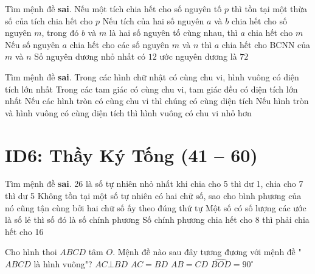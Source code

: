 \begin{ex}%
	Tìm mệnh đề \textbf{sai}.
	\choice
	{Nếu một tích chia hết cho số nguyên tố $p$ thì tồn tại một thừa số của tích chia hết cho $p$}
	{Nếu tích của hai số nguyên $a$ và $b$ chia hết cho số nguyên $m$, trong đó $b$ và $m$ là hai số nguyên tố cùng nhau, thì $a$ chia hết cho $m$}
	{Nếu số nguyên $a$ chia hết cho các số nguyên $m$ và $n$ thì $a$ chia hết cho BCNN của $m$ và $n$}
	{\True Số nguyên dương nhỏ nhất có $12$ ước nguyên dương là $72$} 
\end{ex}


\begin{ex}%
	Tìm mệnh đề \textbf{sai}.
	\choice
	{Trong các hình chữ nhật có cùng chu vi, hình vuông có diện tích lớn nhất}
	{Trong các tam giác có cùng chu vi, tam giác đều có diện tích lớn nhất}
	{Nếu các hình tròn có cùng chu vi thì chúng có cùng diện tích}
	{\True Nếu hình tròn và hình vuông có cùng diện tích thì hình vuông có chu vi nhỏ hơn} 
\end{ex}



\section*{ID6: Thầy Ký Tống (41 -- 60)}
\begin{ex}%
	Tìm mệnh đề \textbf{sai}.
	\choice
	{26 là số tự nhiên nhỏ nhất khi chia cho 5 thì dư 1, chia cho 7 thì dư 5}
	{\True Không tồn tại một số tự nhiên có hai chữ số, sao cho bình phương của nó cũng tận cùng bởi hai chữ số ấy theo đúng thứ tự}
	{Một số có số lượng các ước là số lẻ thì số đó là số chính phương}
	{Số chính phương chia hết cho 8 thì phải chia hết cho 16} 
\end{ex}

\begin{ex}%
	Cho hình thoi $ABCD$ tâm $O$. Mệnh đề nào sau đây tương đương với mệnh đề 
	"$ABCD$ là hình vuông"?
	\choice 
	{$AC\bot BD$}
	{\True $AC=BD$}
	{$AB=CD$}
	{$\widehat{BOD}=90^{\circ}$}
\end{ex}

